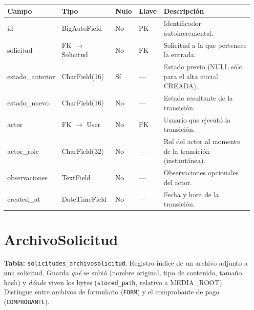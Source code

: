 \documentclass[12pt,letterpaper]{report}
\begin{document}
\begin{longtable}{L{2.9cm} L{2.6cm} C{1.0cm} C{1.0cm} L{6.6cm}}
\toprule
\textbf{Campo} & \textbf{Tipo} & \textbf{Nulo} & \textbf{Llave} & \textbf{Descripción} \\
\midrule
\endhead
id & BigAutoField & No & PK & Identificador autoincremental. \\
solicitud & FK $\rightarrow$ Solicitud & No & FK & Solicitud a la que pertenece la entrada. \\
estado\_anterior & CharField(16) & Sí & --- & Estado previo (NULL sólo para el alta inicial CREADA). \\
estado\_nuevo & CharField(16) & No & --- & Estado resultante de la transición. \\
actor & FK $\rightarrow$ User & No & FK & Usuario que ejecutó la transición. \\
actor\_role & CharField(32) & No & --- & Rol del actor al momento de la transición (instantánea). \\
observaciones & TextField & No & --- & Observaciones opcionales del actor. \\
created\_at & DateTimeField & No & --- & Fecha y hora de la transición. \\
\bottomrule
\end{longtable}

\section{ArchivoSolicitud}

\textbf{Tabla:} \texttt{solicitudes\_archivosolicitud}. Registro índice de un
archivo adjunto a una solicitud. Guarda \emph{qué} se subió (nombre original,
tipo de contenido, tamaño, hash) y \emph{dónde} viven los bytes
(\texttt{stored\_path}, relativo a MEDIA\_ROOT). Distingue entre archivos de
formulario (\texttt{FORM}) y el comprobante de pago (\texttt{COMPROBANTE}).
\end{document}
